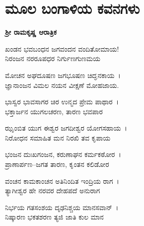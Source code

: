 \chapter[ಮೂಲ ಬಂಗಾಳಿಯ ಕವನಗಳು]{ಮೂಲ ಬಂಗಾಳಿಯ ಕವನಗಳು}

\begin{center}
\textbf{ಶ‍್ರೀ ರಾಮಕೃಷ್ಣ ಆರಾತ್ರಿಕ}
\end{center}

\begin{myquote}
ಖಂಡನ ಭವಬಂಧನ ಜಗವಂದನ ವಂದಿತೋಮಾಯ!\\ನಿರಂಜನ ನರರೂಪಧರ ನಿರ್ಗುಣಗುಣಮಯ
\end{myquote}


\begin{myquote}
ಮೋಚನ ಅಘದೂಷಣ ಜಗಭೂಷಣ ಚಿದ್ಘನಕಾಯ~।\\ಜ್ಞಾನಾಂಜನ ವಿಮಲ ನಯನ ವೀಕ್ಷಣೆ ಮೋಹಜಾಯ.
\end{myquote}


\begin{myquote}
ಭಾಸ್ವರ ಭಾವಸಾಗರ ಚಿರ ಉನ್ಮದ ಪ್ರೇಮ ಪಾಥಾರ~।\\ಭಕ್ತಾರ್ಜನ ಯುಗಲಚರಣ, ತಾರಣ ಭವಪಾರ
\end{myquote}


\begin{myquote}
ಝೃಂಬಿತ ಯುಗ ಈಶ್ವರ ಜಗದೀಶ್ವರ ಯೋಗಸಹಾಯ~।\\ನಿರೋಧನ ಸಮಾಹಿತ ಮನ ನಿರಖಿ ತವ ಕೃಪಾಯ
\end{myquote}


\begin{myquote}
ಭಂಜನ ದುಃಖಗಂಜನ, ಕರುಣಾಘನ ಕರ್ಮಕಠೋರ~।\\ಪ್ರಾಣಾರ್ಪಣ–ಜಗತ ತಾರಣ, ಕೃಂತನ ಕಲಿಡೋರ
\end{myquote}


\begin{myquote}
ವಂಚನ ಕಾಮಕಾಂಚನ ಅತಿನಿಂದಿತ ಇಂದ್ರಿಯ ರಾಗ~।\\ತ್ಯಾಗೀಶ್ವರ ಹೇ ನರವರ ದೇಹಪದೆ ಅನುರಾಗ
\end{myquote}


\begin{myquote}
ನಿರ್ಭಯ ಗತಸಂಶಯ ದೃಢನಿಶ್ಚಯ ಮಾನಸವಾನ್~।\\ನಿಷ್ಕಾರಣ ಭಕತಶರಣ ತ್ಯಜಿ ಜಾತಿ ಕುಲ ಮಾನ
\end{myquote}

